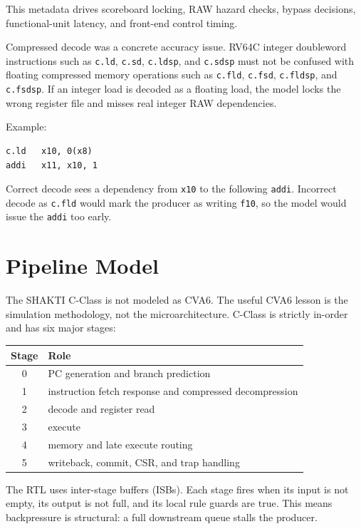 \documentclass[11pt]{article}
\begin{document}
This metadata drives scoreboard locking, RAW hazard checks, bypass decisions,
functional-unit latency, and front-end control timing.

Compressed decode was a concrete accuracy issue. RV64C integer doubleword
instructions such as \texttt{c.ld}, \texttt{c.sd}, \texttt{c.ldsp}, and
\texttt{c.sdsp} must not be confused with floating compressed memory operations
such as \texttt{c.fld}, \texttt{c.fsd}, \texttt{c.fldsp}, and \texttt{c.fsdsp}.
If an integer load is decoded as a floating load, the model locks the wrong
register file and misses real integer RAW dependencies.

Example:

\begin{verbatim}
c.ld   x10, 0(x8)
addi   x11, x10, 1
\end{verbatim}

Correct decode sees a dependency from \texttt{x10} to the following
\texttt{addi}. Incorrect decode as \texttt{c.fld} would mark the producer as
writing \texttt{f10}, so the model would issue the \texttt{addi} too early.

\section{Pipeline Model}

The SHAKTI C-Class is not modeled as CVA6. The useful CVA6 lesson is the
simulation methodology, not the microarchitecture. C-Class is strictly in-order
and has six major stages:

\begin{center}
\begin{tabular}{|c|l|}
\hline
Stage & Role \\
\hline
0 & PC generation and branch prediction \\
1 & instruction fetch response and compressed decompression \\
2 & decode and register read \\
3 & execute \\
4 & memory and late execute routing \\
5 & writeback, commit, CSR, and trap handling \\
\hline
\end{tabular}
\end{center}

The RTL uses inter-stage buffers (ISBs). Each stage fires when its input is not
empty, its output is not full, and its local rule guards are true. This means
backpressure is structural: a full downstream queue stalls the producer.
\end{document}
